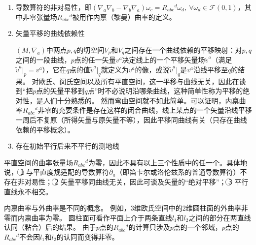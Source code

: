 \begin{enumerate}[（1）]
\item 导数算符的非对易性，即$(\nabla_a\nabla_b - \nabla_b\nabla_a)\omega_c = R_{abc}{}^d\omega_d, ~ \forall \omega_d \in \mathscr{F}(0, 1)$，其中非零张量场$R_{abc}{}^d$被用作内禀（黎曼）曲率的定义。
\item 矢量平移的曲线依赖性

$(M, \nabla_a)$中两点$p, q$的切空间$V_p$和$V_q$之间存在一个曲线依赖的平移映射：对$p, q$之间的一段曲线，$p$点的任一矢量$v^a$决定线上的一个平移矢量场$\tilde{v}^a$（满足$\tilde{v}^a|_p = v^a$），它在$q$点的值$\tilde{v}^a|_q$就定义为$v^a$的像，或说$\tilde{v}^a|_q$是$v^a$沿线平移至$q$的结果。
对欧氏、闵氏空间以及所有平直空间，这一平移与曲线无关，因此在谈到``把$p$点的矢量平移到$q$点''时不必说明沿哪条曲线，这种简单性称为平移的绝对性，是人们十分熟悉的。
然而弯曲空间就不如此简单。可以证明，内禀曲率$R_{abc}{}^d$非零的充要条件是存在这样的闭合曲线，线上某点的一个矢量沿线平移一周后不复原（所得矢量与原矢量不等），因此平移同曲线有关（只存在曲线依赖的平移概念）。
\item 存在初始平行后来不平行的测地线
\end{enumerate}

平直空间的曲率张量场$R_{abc}{}^d$为零，因此不具有以上三个性质中的任一个。具体地说，
\textcircled{1} 与平直度规适配的导数算符$\partial_a$（即笛卡尔或洛伦兹系的普通导数算符）不存在非对易性；
\textcircled{2} 矢量平移同曲线无关，因此可谈及矢量的``绝对平移''；
\textcircled{3} 平行直线永不相交。

内禀曲率与外曲率是不同的概念。
例如，$3$维欧氏空间中的$2$维圆柱面的外曲率非零而内禀曲率为零。
圆柱面可看作平面上介于两条直线$l_1$和$l_2$之间的部分在两直线认同（粘合）后的结果。
由于$p$点的$R_{abc}{}^d$的计算只涉及$p$点的一个邻域，$p$点的$R_{abc}{}^d$不会因$l_1$和$l_2$的认同而变得非零。
